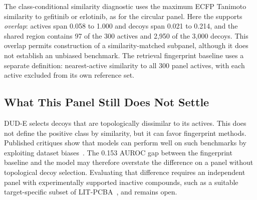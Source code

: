 \documentclass[11pt]{article}
\begin{document}
The class-conditional similarity diagnostic uses the maximum ECFP Tanimoto similarity to gefitinib or erlotinib, as for the circular panel. Here the supports \emph{overlap}: actives span 0.058 to 1.000 and decoys span 0.021 to 0.214, and the shared region contains 97 of the 300 actives and 2,950 of the 3,000 decoys. This overlap permits construction of a similarity-matched subpanel, although it does not establish an unbiased benchmark. The retrieval fingerprint baseline uses a separate definition: nearest-active similarity to all 300 panel actives, with each active excluded from its own reference set.

\subsection{What This Panel Still Does Not Settle}
DUD-E selects decoys that are topologically dissimilar to its actives. This does not define the positive class by similarity, but it can favor fingerprint methods. Published critiques show that models can perform well on such benchmarks by exploiting dataset biases~\cite{chen2019hiddenbias,wallach2018memorization}. The 0.153 AUROC gap between the fingerprint baseline and the model may therefore overstate the difference on a panel without topological decoy selection. Evaluating that difference requires an independent panel with experimentally supported inactive compounds, such as a suitable target-specific subset of LIT-PCBA~\cite{trannguyen2020litpcba}, and remains open.



\end{document}
